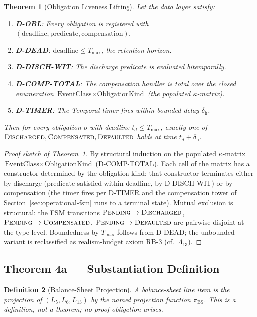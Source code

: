 \documentclass[11pt,a4paper]{article}
\newtheorem{definition}{Definition}[section]
\newtheorem{theorem}[definition]{Theorem}
\begin{document}
\begin{theorem}[Obligation Liveness Lifting]
\label{thm:liveness}
Let the data layer satisfy:
\begin{enumerate}[nosep]
\item \textbf{D-OBL}: Every obligation is registered with $(\text{deadline}, \text{predicate}, \text{compensation})$.
\item \textbf{D-DEAD}: $\text{deadline} \le T_{\max}$, the retention horizon.
\item \textbf{D-DISCH-WIT}: The discharge predicate is evaluated bitemporally.
\item \textbf{D-COMP-TOTAL}: The compensation handler is total over the closed enumeration $\text{EventClass} \times \text{ObligationKind}$ (the populated $\kappa$-matrix).
\item \textbf{D-TIMER}: The Temporal timer fires within bounded delay $\delta_{\mathrm{h}}$.
\end{enumerate}
Then for every obligation $o$ with deadline $t_d \le T_{\max}$, exactly one of $\textsc{Discharged}, \textsc{Compensated}, \textsc{Defaulted}$ holds at time $t_d + \delta_{\mathrm{h}}$.
\end{theorem}

\begin{proof}[Proof sketch of Theorem~\ref{thm:liveness}]
By structural induction on the populated $\kappa$-matrix $\text{EventClass} \times \text{ObligationKind}$ (D-COMP-TOTAL). Each cell of the matrix has a constructor determined by the obligation kind; that constructor terminates either by discharge (predicate satisfied within deadline, by D-DISCH-WIT) or by compensation (the timer fires per D-TIMER and the compensation tower of Section~\ref{sec:operational-fsm} runs to a terminal state). Mutual exclusion is structural: the FSM transitions $\textsc{Pending} \to \textsc{Discharged}$, $\textsc{Pending} \to \textsc{Compensated}$, $\textsc{Pending} \to \textsc{Defaulted}$ are pairwise disjoint at the type level. Boundedness by $T_{\max}$ follows from D-DEAD; the unbounded variant is reclassified as realism-budget axiom RB-3 (cf.~$\Lambda_{13}$). \qedhere
\end{proof}

\subsection{Theorem 4a --- Substantiation Definition}
\label{sec:thm-substantiation}

\begin{definition}[Balance-Sheet Projection]
\label{def:balance-sheet-proj}
A balance-sheet line item is the projection of $(L_5, L_6, L_{13})$ by the named projection function $\pi_{\mathrm{BS}}$. This is a definition, not a theorem; no proof obligation arises.
\end{definition}
\end{document}
